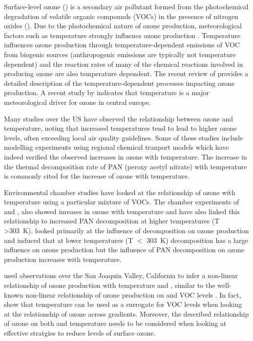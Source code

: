 Surface-level ozone () is a secondary air pollutant formed from the photochemical degradation of volatile organic compounds (VOCs) in the presence of nitrogen oxides ().
Due to the photochemical nature of ozone production, meteorological factors such as temperature strongly influence ozone production \citep{Jacob:2009}.
Temperature influences ozone production through temperature-dependent emissions of VOC from biogenic sources (anthropogenic emissions are typically not temperature dependent) and the reaction rates of many of the chemical reactions involved in producing ozone are also temperature dependent.
The recent review of \citet{Pusede:2015} provides a detailed description of the temperature-dependent processes impacting ozone production.
A recent study by  indicates that temperature is a major meteorological driver for ozone in central europe.

Many studies over the US \citep{Sillman:1995a, Aw:2003, Pusede:2014} have observed the relationship between ozone and temperature, noting that increased temperatures tend to lead to higher ozone levels, often exceeding local air quality guidelines.
Some of these studies \citep{Sillman:1995a, Aw:2003} include modelling experiments using regional chemical tranport models which have indeed verified the observed increases in ozone with temperature.
The increase in the thermal decomposition rate of PAN (peroxy acetyl nitrate) with temperature is commonly cited for the increase of ozone with temperature.

Environmental chamber studies have looked at the relationship of ozone with temperature using a particular mixture of VOCs.
The chamber experiments of \citet{Carter:1979} and \citet{Hatakeyama:1991}, also showed inreases in ozone with temperature and have also linked this relationship to increased PAN decomposition at higher temperatures (T \textgreater 303~K).
\citet{Hatakeyama:1991} looked primarily at the influence of  decomposition on ozone production and induced that at lower temperatures (T $<$ 303~K)  decomposition has a large influence on ozone production but the influence of PAN decomposition on ozone production increases with temperature.

\citet{Pusede:2014} used observations over the San Joaquin Valley, California to infer a non-linear relationship of ozone production with temperature and , similar to the well-known non-linear relationship of ozone production on  and VOC levels \citep{Sillman:1999}.
In fact, \citet{Pusede:2014} show that temperature can be used as a surrogate for VOC levels when looking at the relationship of ozone across  gradients.
Moreover, the described relationship of ozone on both  and temperature needs to be considered when looking at effective stratgies to reduce levels of surface ozone.

